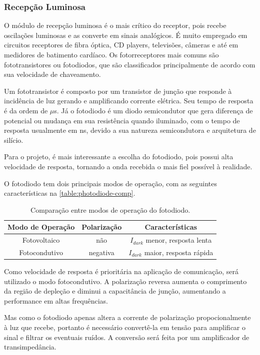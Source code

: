 	\subsubsection{Recepção Luminosa}\label{section:light-reception}

	O módulo de recepção luminosa é o mais crítico do receptor, pois recebe oscilações luminosas e as converte em sinais analógicos. É muito empregado em circuitos receptores de fibra óptica, CD players, televisões, câmeras e até em medidores de batimento cardíaco. Os fotorreceptores mais comuns são fototransistores ou fotodiodos, que são classificados principalmente de acordo com sua velocidade de chaveamento.

	Um fototransistor é composto por um transistor de junção que responde à incidência de luz gerando e amplificando corrente elétrica. Seu tempo de resposta é da ordem de $\mu$s. Já o fotodiodo é um diodo semicondutor que gera diferença de potencial ou mudança em sua resistência quando iluminado, com o tempo de resposta usualmente em ns, devido a sua natureza semicondutora e arquitetura de silício.

	Para o projeto, é mais interessante a escolha do fotodiodo, pois possui alta velocidade de resposta, tornando a onda recebida o mais fiel possível à realidade.

	O fotodiodo tem dois principais modos de operação, com as seguintes características na \autoref{table:photodiode-comp}.

	\begin{table}[ht]
		\caption{Comparação entre modos de operação do fotodiodo.}
		\centering
		\begin{tabular}{c c c}
			\hline
			Modo de Operação  & Polarização & Características \\ \hline
			Fotovoltaico & não & $I_{dark}$ menor, resposta lenta \\
			Fotocondutivo & negativa & $I_{dark}$ maior, resposta rápida \\ \hline
		\end{tabular}
		\label{table:photodiode-comp}
	\end{table}

	Como velocidade de resposta é prioritária na aplicação de comunicação, será utilizado o modo fotocondutivo. A polarização reversa aumenta o comprimento da região de depleção e diminui a capacitância de junção, aumentando a performance em altas frequências.

	Mas como o fotodiodo apenas altera a corrente de polarização propocionalmente à luz que recebe, portanto é necessário convertê-la em tensão para amplificar o sinal e filtrar os eventuais ruídos. A conversão será feita por um amplificador de transimpedância.

